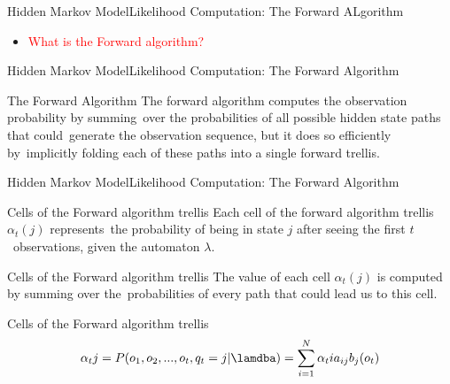 \documentclass[10pt]{beamer}
\begin{document}
\begin{frame}{Hidden Markov Model}{Likelihood Computation: The Forward ALgorithm}
    \begin{itemize}
      \item \textcolor{red}{What is the Forward algorithm?}
    \end{itemize}
\end{frame}

\begin{frame}{Hidden Markov Model}{Likelihood Computation: The Forward Algorithm}
    \begin{block}{The Forward Algorithm}
        The forward algorithm computes the observation probability by summing\
        over the probabilities of all possible hidden state paths that could\  
        generate the observation sequence, but it does so efficiently by\
        implicitly folding each of these paths into a single forward trellis.
    \end{block}
\end{frame}

\begin{frame}{Hidden Markov Model}{Likelihood Computation: The Forward Algorithm}
    \begin{block}{Cells of the Forward algorithm trellis}
         Each cell of the forward algorithm trellis $\alpha_t(j)$ represents\
         the probability of being in state $j$ after seeing the first $t$\
         observations, given the automaton $\lambda$.
    \end{block}
    \begin{block}{Cells of the Forward algorithm trellis}
         The value of each cell $\alpha_t(j)$ is computed by summing over the\
         probabilities of every path that could lead us to this cell.
    \end{block}
    \begin{block}{Cells of the Forward algorithm trellis}
        \begin{equation}
            \alpha_t{j} = P(o_1, o_2, ..., o_t, q_t = j|\lamdba) = \sum_{i=1}^{N}\alpha_t{i}a_{ij}b_j(o_t)
        \end{equation}
    \end{block}
\end{frame}
\end{document}
